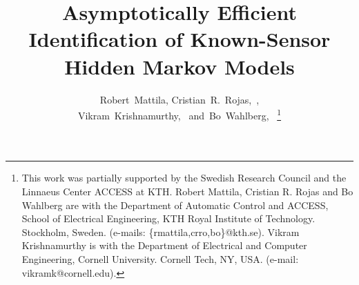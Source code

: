 \documentclass[journal]{IEEEtran}
\begin{document}
%
\title{Asymptotically Efficient Identification of Known-Sensor Hidden Markov Models}
%
%
%


\author{Robert~Mattila,
        Cristian~R.~Rojas,~,\\
        Vikram~Krishnamurthy,~
        and~Bo~Wahlberg,~%
\thanks{This work was partially supported by the Swedish Research
Council and the Linnaeus Center ACCESS at KTH. Robert Mattila, Cristian R. Rojas and Bo Wahlberg are with the Department of
    Automatic Control and ACCESS, School of Electrical Engineering, KTH Royal
    Institute of Technology. Stockholm, Sweden. (e-mails: 
\{rmattila,crro,bo\}@kth.se).
Vikram Krishnamurthy is with the Department of Electrical and Computer
Engineering, Cornell University. Cornell Tech, NY, USA. (e-mail:
vikramk@cornell.edu).}%
        }

\end{document}
